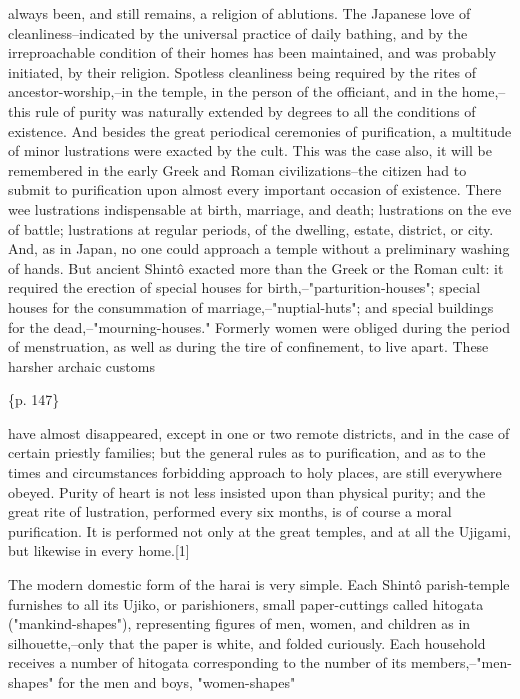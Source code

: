 always been, and still remains, a religion of ablutions. The Japanese love of cleanliness--indicated by the universal practice of daily bathing, and by the irreproachable condition of their homes has been maintained, and was probably initiated, by their religion. Spotless cleanliness being required by the rites of ancestor-worship,--in the temple, in the person of the officiant, and in the home,--this rule of purity was naturally extended by degrees to all the conditions of existence. And besides the great periodical ceremonies of purification, a multitude of minor lustrations were exacted by the cult. This was the case also, it will be remembered in the early Greek and Roman civilizations--the citizen had to submit to purification upon almost every important occasion of existence. There wee lustrations indispensable at birth, marriage, and death; lustrations on the eve of battle; lustrations at regular periods, of the dwelling, estate, district, or city. And, as in Japan, no one could approach a temple without a preliminary washing of hands. But ancient Shintô exacted more than the Greek or the Roman cult: it required the erection of special houses for birth,--"parturition-houses"; special houses for the consummation of marriage,--"nuptial-huts"; and special buildings for the dead,--"mourning-houses." Formerly women were obliged during the period of menstruation, as well as during the tire of confinement, to live apart. These harsher archaic customs

\{p. 147\}

have almost disappeared, except in one or two remote districts, and in the case of certain priestly families; but the general rules as to purification, and as to the times and circumstances forbidding approach to holy places, are still everywhere obeyed. Purity of heart is not less insisted upon than physical purity; and the great rite of lustration, performed every six months, is of course a moral purification. It is performed not only at the great temples, and at all the Ujigami, but likewise in every home.[1]



The modern domestic form of the harai is very simple. Each Shintô parish-temple furnishes to all its Ujiko, or parishioners, small paper-cuttings called hitogata ("mankind-shapes"), representing figures of men, women, and children as in silhouette,--only that the paper is white, and folded curiously. Each household receives a number of hitogata corresponding to the number of its members,--"men-shapes" for the men and boys, "women-shapes"

